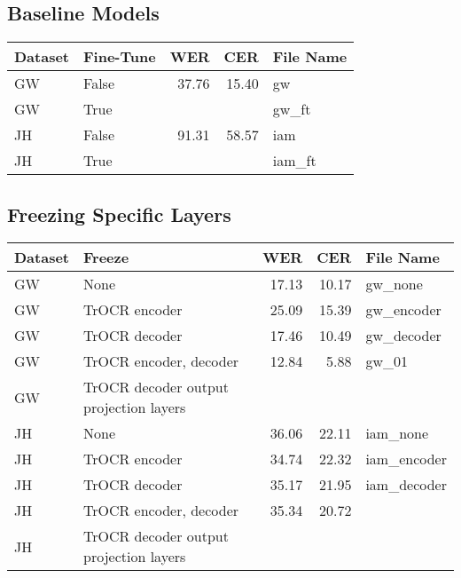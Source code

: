 \subsection{Baseline Models}
\label{subsec:5_baseline_models}
\begin{tabular}{l|l||r|r|l}
    Dataset	& Fine-Tune                                 & WER	& CER	& File Name	\\
    \hline
    \hline
    GW		& False	                                	& 37.76	& 15.40	& gw\\
    GW		& True	                        	        & 	& 	& gw\_ft\\
    \hline
    JH		& False		                                & 91.31 & 58.57 & iam\\
    JH		& True 		                                &  &  & iam\_ft\\
    \hline
    \end{tabular}
\subsection{Freezing Specific Layers}
\label{subsec:5_freezing_specific_layers}
\begin{tabular}{l|l||r|r|l}
    Dataset	& Freeze                                  	& WER	& CER	& File Name	\\
    \hline
    \hline
    GW		& None	                                	& 17.13	& 10.17	& gw\_none\\
    GW		& TrOCR encoder	                        	& 25.09	& 15.39	& gw\_encoder\\
    GW	    & TrOCR decoder	                            & 17.46	& 10.49	& gw\_decoder\\
    GW	    & TrOCR encoder, decoder	                & 12.84	& 5.88	& gw\_01\\
    GW	    & TrOCR decoder output projection layers	&       &  	    &\\
    \hline
    JH		& None		                                & 36.06 & 22.11 & iam\_none\\
    JH		& TrOCR encoder		                        & 34.74 & 22.32 & iam\_encoder\\
    JH	    & TrOCR decoder                          	& 35.17 & 21.95 & iam\_decoder\\
    JH	    & TrOCR encoder, decoder	                & 35.34	& 20.72	&\\
    JH	    & TrOCR decoder output projection layers	&       &  	    &\\ 
    \hline
    \end{tabular}
